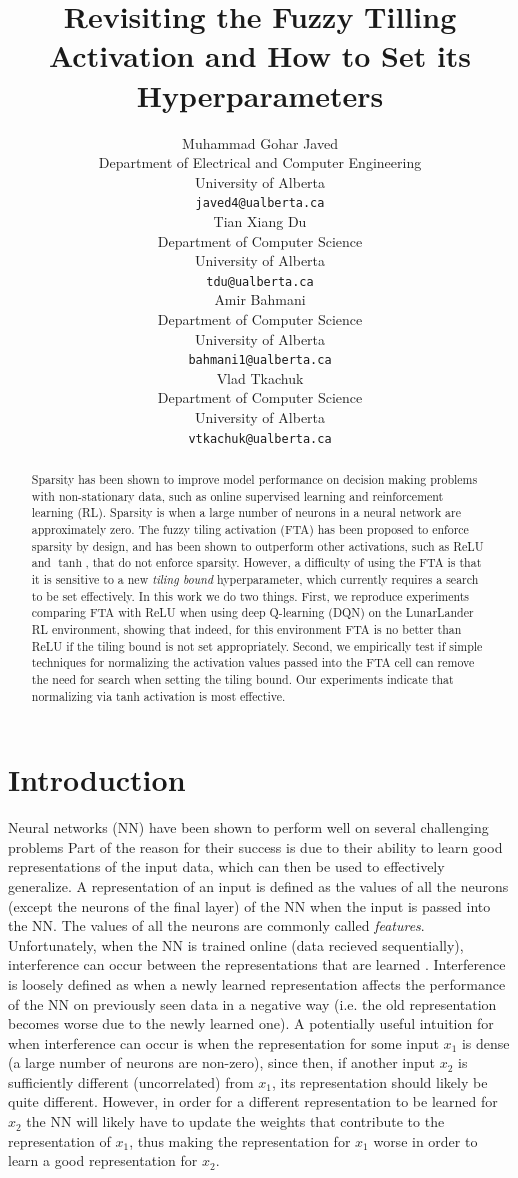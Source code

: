 \documentclass{article}
\title{Revisiting the Fuzzy Tilling Activation and How to Set its Hyperparameters}
\author{%
  Muhammad Gohar Javed \\
  Department of Electrical and Computer Engineering \\
  University of Alberta\\
  \texttt{javed4@ualberta.ca} \\
  \And
  Tian Xiang Du \\
  Department of Computer Science\\
  University of Alberta\\
  \texttt{tdu@ualberta.ca} \\
  \AND
  Amir Bahmani \\
  Department of Computer Science\\
  University of Alberta\\
  \texttt{bahmani1@ualberta.ca} \\
  \And
  Vlad Tkachuk \\
  Department of Computer Science\\
  University of Alberta\\
  \texttt{vtkachuk@ualberta.ca} \\
}
\begin{document}
\maketitle


\begin{abstract}
  Sparsity has been shown to improve model performance on decision making problems with non-stationary data, such as online supervised learning and reinforcement learning (RL).
  Sparsity is when a large number of neurons in a neural network are approximately zero.
  The fuzzy tiling activation (FTA) has been proposed to enforce sparsity by design, and has been shown to outperform other activations, such as ReLU and $\tanh$, that do not enforce sparsity.
  However, a difficulty of using the FTA is that it is sensitive to a new \textit{tiling bound} hyperparameter, which currently requires a search to be set effectively.
  In this work we do two things.
  First, we reproduce experiments comparing FTA with ReLU when using deep Q-learning (DQN) on the LunarLander RL environment, showing that indeed, for this environment FTA is no better than ReLU if the tiling bound is not set appropriately.
  Second, we empirically test if simple techniques for normalizing the activation values passed into the FTA cell can remove the need for search when setting the tiling bound.
  Our experiments indicate that normalizing via tanh activation is most effective.


\end{abstract}


\section{Introduction} \label{sec:intro}
Neural networks (NN) have been shown to perform well on several challenging problems \cite{brown2020language,krizhevsky2017imagenet,mnih2013playing,silver2017mastering}
Part of the reason for their success is due to their ability to learn good representations of the input data, which can then be used to effectively generalize.
A representation of an input is defined as the values of all the neurons (except the neurons of the final layer) of the NN when the input is passed into the NN.
The values of all the neurons are commonly called \textit{features}.
Unfortunately, when the NN is trained online (data recieved sequentially), interference can occur between the representations that are learned \cite[]{chandak2019learning,caselles2018continual,madjiheurem2019representation}.
Interference is loosely defined as when a newly learned representation affects the performance of the NN on previously seen data in a negative way (i.e. the old representation becomes worse due to the newly learned one).
A potentially useful intuition for when interference can occur is when the representation for some input $x_1$ is dense (a large number of neurons are non-zero),
since then, if another input $x_2$ is sufficiently different (uncorrelated) from $x_1$, its representation should likely be quite different.
However, in order for a different representation to be learned for $x_2$ the NN will likely have to update the weights that contribute to the representation of $x_1$,
thus making the representation for $x_1$ worse in order to learn a good representation for $x_2$.
\end{document}
